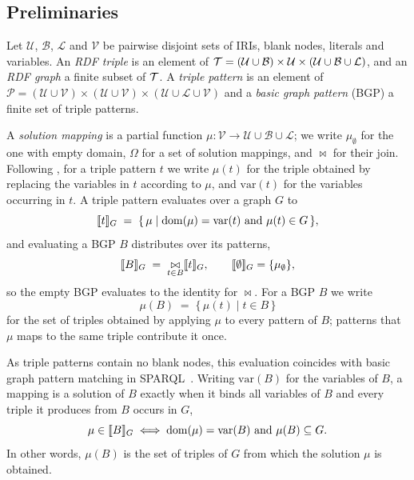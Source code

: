 \subsection{Preliminaries}

Let $\mathcal{U}$, $\mathcal{B}$, $\mathcal{L}$ and $\mathcal{V}$ be pairwise disjoint
sets of IRIs, blank nodes, literals and variables. An \emph{RDF triple} is an element of
$\mathcal{T} = (\mathcal{U} \cup \mathcal{B}) \times \mathcal{U} \times
(\mathcal{U} \cup \mathcal{B} \cup \mathcal{L})$, and an \emph{RDF graph} a finite subset
of $\mathcal{T}$. A \emph{triple pattern} is an element of
$\mathcal{P} = (\mathcal{U} \cup \mathcal{V}) \times (\mathcal{U} \cup \mathcal{V})
\times (\mathcal{U} \cup \mathcal{L} \cup \mathcal{V})$ and a \emph{basic graph pattern}
(BGP) a finite set of triple patterns.

A \emph{solution mapping} is a partial function
$\mu : \mathcal{V} \to \mathcal{U} \cup \mathcal{B} \cup \mathcal{L}$; we write
$\mu_\emptyset$ for the one with empty domain, $\Omega$ for a set of solution mappings,
and $\bowtie$ for their join. Following \citet{perez2009semantics}, for a triple pattern
$t$ we write $\mu(t)$ for the triple obtained by replacing the variables in $t$ according
to $\mu$, and $\mathrm{var}(t)$ for the variables occurring in $t$. A triple pattern
evaluates over a graph $G$ to
\[
  \llbracket t \rrbracket_{G} \;=\; \{\, \mu \mid \mathrm{dom}(\mu) = \mathrm{var}(t) \text{ and }
  \mu(t) \in G \,\},
\]
and evaluating a BGP $B$ distributes over its patterns,
\[
  \llbracket B \rrbracket_{G} \;=\; \mathop{\bowtie}\limits_{t \in B} \llbracket t \rrbracket_{G},
  \qquad \llbracket \emptyset \rrbracket_{G} = \{\mu_\emptyset\},
\]
so the empty BGP evaluates to the identity for $\bowtie$. For a BGP $B$ we write
\[
  \mu(B) \;=\; \{\, \mu(t) \mid t \in B \,\}
\]
for the set of triples obtained by applying $\mu$ to every pattern of $B$; patterns that
$\mu$ maps to the same triple contribute it once. 

As triple patterns contain no blank nodes, this evaluation coincides with basic graph
pattern matching in SPARQL~\cite{sparql11-query}. Writing
$\mathrm{var}(B)$ for the variables of $B$, a mapping is a solution of $B$ exactly when
it binds all variables of $B$ and every triple it produces from $B$ occurs in $G$,
\begin{equation}
  \label{eq:bgp-match}
  \mu \in \llbracket B \rrbracket_{G} \iff \mathrm{dom}(\mu) = \mathrm{var}(B) \text{ and }
  \mu(B) \subseteq G.
\end{equation}
In other words, $\mu(B)$ is the set of triples of $G$ from which the solution $\mu$ is
obtained.

